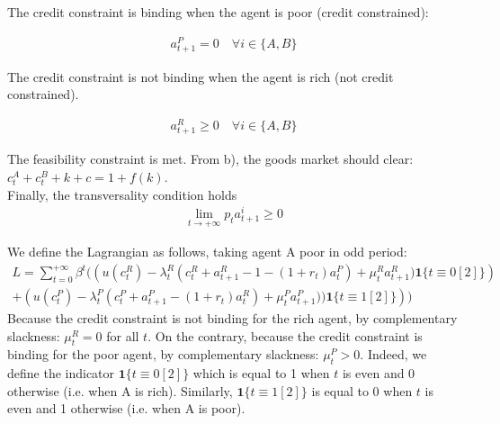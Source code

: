 \documentclass{article}
\begin{document}
The credit constraint is binding when the agent is poor (credit constrained):

\begin{gather*}
a_{t+1}^P=0\quad\forall i\in\{A,B\}
\end{gather*}

The credit constraint is not binding when the agent is rich (not credit constrained).

\begin{gather*}
    a_{t+1}^R\geq0\quad\forall i\in\{A,B\}
\end{gather*}

The feasibility constraint is met. From b), the goods market should clear: $c_t^A+c_t^B+k+c=1+f(k)$. \\
Finally, the transversality condition holds
\begin{gather*}
    \lim_{t\rightarrow +\infty} p_ta_{t+1}^i \geq 0
\end{gather*}

We define the Lagrangian as follows, taking agent A poor in odd period:
\begin{gather*}
    L=\sum_{t=0}^{+\infty}\beta^t ( \left( u(c_t^R)-\lambda_t^R(c_t^R+a^R_{t+1}-1-(1+r_t)a^P_t)+\mu^R_t a_{t+1}^R)\mathbf{1}\{t\equiv0[2]\}\right)\\
    +\left( u(c_t^P)-\lambda_t^P(c_t^P+a^P_{t+1}-(1+r_t)a_t^R)+\mu^P_t a_{t+1}^P))\mathbf{1}\{t\equiv1[2]\}\right) )
\end{gather*}
Because the credit constraint is not binding for the rich agent, by complementary slackness: $\mu_t^R=0$ for all $t$. On the contrary, because the credit constraint is binding for the poor agent, by complementary slackness: $\mu_t^P>0$.
Indeed, we define the indicator $\mathbf{1}\{t\equiv0[2]\}$ which is equal to 1 when $t$ is even and 0 otherwise (i.e. when A is rich). Similarly, $\mathbf{1}\{t\equiv1[2]\}$ is equal to 0 when $t$ is even and 1 otherwise (i.e. when A is poor).\\
\end{document}
